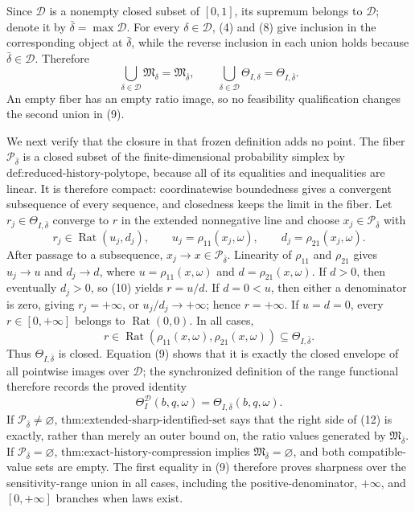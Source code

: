 Since \(\mathcal D\) is a nonempty closed subset of \([0,1]\), its supremum belongs to \(\mathcal D\); denote it by \(\bar\delta=\max\mathcal D\).  For every \(\delta\in\mathcal D\), (4) and (8) give inclusion in the corresponding object at \(\bar\delta\), while the reverse inclusion in each union holds because \(\bar\delta\in\mathcal D\).  Therefore
\[
 \bigcup_{\delta\in\mathcal D}\mathfrak M_\delta
 =\mathfrak M_{\bar\delta},
 \qquad
 \bigcup_{\delta\in\mathcal D}\Theta_{I,\delta}
 =\Theta_{I,\bar\delta}.
\tag{9}
\]
An empty fiber has an empty ratio image, so no feasibility qualification changes the second union in (9).

We next verify that the closure in that frozen definition adds no point.  The fiber \(\mathcal P_{\bar\delta}\) is a closed subset of the finite-dimensional probability simplex by \(\text{def:reduced-history-polytope}\), because all of its equalities and inequalities are linear.  It is therefore compact: coordinatewise boundedness gives a convergent subsequence of every sequence, and closedness keeps the limit in the fiber.  Let \(r_j\in\Theta_{I,\bar\delta}\) converge to \(r\) in the extended nonnegative line and choose \(x_j\in\mathcal P_{\bar\delta}\) with
\[
 r_j\in\operatorname{Rat}(u_j,d_j),
 \qquad
 u_j=\rho_{11}(x_j,\omega),
 \qquad
 d_j=\rho_{21}(x_j,\omega).
\tag{10}
\]
After passage to a subsequence, \(x_j\to x\in\mathcal P_{\bar\delta}\).  Linearity of \(\rho_{11}\) and \(\rho_{21}\) gives \(u_j\to u\) and \(d_j\to d\), where \(u=\rho_{11}(x,\omega)\) and \(d=\rho_{21}(x,\omega)\).  If \(d>0\), then eventually \(d_j>0\), so (10) yields \(r=u/d\).  If \(d=0<u\), then either a denominator is zero, giving \(r_j=+\infty\), or \(u_j/d_j\to+\infty\); hence \(r=+\infty\).  If \(u=d=0\), every \(r\in[0,+\infty]\) belongs to \(\operatorname{Rat}(0,0)\).  In all cases,
\[
 r\in\operatorname{Rat}\!\left(\rho_{11}(x,\omega),
                                  \rho_{21}(x,\omega)\right)
 \subseteq\Theta_{I,\bar\delta}.
\tag{11}
\]
Thus \(\Theta_{I,\bar\delta}\) is closed.  Equation (9) shows that it is exactly the closed envelope of all pointwise images over \(\mathcal D\); the synchronized definition of the range functional therefore records the proved identity
\[
 \Theta_I^{\mathcal D}(b,q,\omega)
 =\Theta_{I,\bar\delta}(b,q,\omega).
\tag{12}
\]
If \(\mathcal P_{\bar\delta}\neq\varnothing\), \(\text{thm:extended-sharp-identified-set}\) says that the right side of (12) is exactly, rather than merely an outer bound on, the ratio values generated by \(\mathfrak M_{\bar\delta}\).  If \(\mathcal P_{\bar\delta}=\varnothing\), \(\text{thm:exact-history-compression}\) implies \(\mathfrak M_{\bar\delta}=\varnothing\), and both compatible-value sets are empty.  The first equality in (9) therefore proves sharpness over the sensitivity-range union in all cases, including the positive-denominator, \(+\infty\), and \([0,+\infty]\) branches when laws exist.

